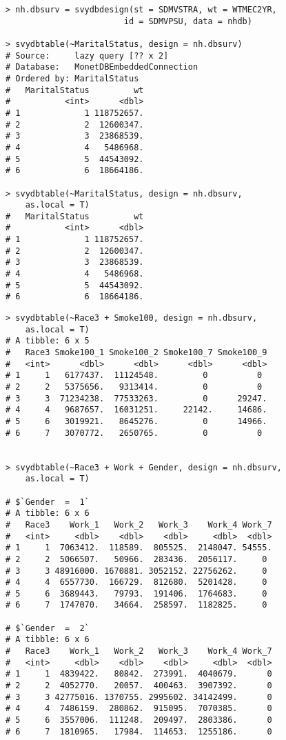 \begin{lstlisting}
> nh.dbsurv = svydbdesign(st = SDMVSTRA, wt = WTMEC2YR, 
                        id = SDMVPSU, data = nhdb)

> svydbtable(~MaritalStatus, design = nh.dbsurv)
# Source:     lazy query [?? x 2]
# Database:   MonetDBEmbeddedConnection
# Ordered by: MaritalStatus
#   MaritalStatus         wt
#           <int>      <dbl>
# 1             1 118752657.
# 2             2  12600347.
# 3             3  23868539.
# 4             4   5486968.
# 5             5  44543092.
# 6             6  18664186.                       

> svydbtable(~MaritalStatus, design = nh.dbsurv, 
    as.local = T)
#   MaritalStatus         wt
#           <int>      <dbl>
# 1             1 118752657.
# 2             2  12600347.
# 3             3  23868539.
# 4             4   5486968.
# 5             5  44543092.
# 6             6  18664186.
\end{lstlisting}
\newpage
\begin{lstlisting}
> svydbtable(~Race3 + Smoke100, design = nh.dbsurv, 
    as.local = T)
# A tibble: 6 x 5
#   Race3 Smoke100_1 Smoke100_2 Smoke100_7 Smoke100_9
#   <int>      <dbl>      <dbl>      <dbl>      <dbl>
# 1     1   6177437.  11124548.         0          0 
# 2     2   5375656.   9313414.         0          0 
# 3     3  71234238.  77533263.         0      29247.
# 4     4   9687657.  16031251.     22142.     14686.
# 5     6   3019921.   8645276.         0      14966.
# 6     7   3070772.   2650765.         0          0 


> svydbtable(~Race3 + Work + Gender, design = nh.dbsurv, 
    as.local = T)

# $`Gender  =  1`
# A tibble: 6 x 6
#   Race3    Work_1   Work_2   Work_3    Work_4 Work_7
#   <int>     <dbl>    <dbl>    <dbl>     <dbl>  <dbl>
# 1     1  7063412.  118589.  805525.  2148047. 54555.
# 2     2  5066507.   50966.  283436.  2056117.     0 
# 3     3 48916000. 1670881. 3052152. 22756262.     0 
# 4     4  6557730.  166729.  812680.  5201428.     0 
# 5     6  3689443.   79793.  191406.  1764683.     0 
# 6     7  1747070.   34664.  258597.  1182825.     0 

# $`Gender  =  2`
# A tibble: 6 x 6
#   Race3    Work_1   Work_2   Work_3    Work_4 Work_7
#   <int>     <dbl>    <dbl>    <dbl>     <dbl>  <dbl>
# 1     1  4839422.   80842.  273991.  4040679.      0
# 2     2  4052770.   20057.  400463.  3907392.      0
# 3     3 42775016. 1370755. 2995602. 34142499.      0
# 4     4  7486159.  280862.  915095.  7070385.      0
# 5     6  3557006.  111248.  209497.  2803386.      0
# 6     7  1810965.   17984.  114653.  1255186.      0

\end{lstlisting}
\\

